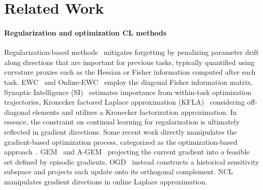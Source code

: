 \documentclass{article}
\begin{document}
\section{Related Work}

\paragraph{Regularization and optimization CL methods }

Regularization-based methods~\cite{EWC2017,onlineEWC,SI2017,KFLANEURIPS2018_Ritter} mitigates forgetting by penalizing parameter drift along directions that are important for previous tasks,
typically quantified using curvature proxies such as the Hessian or Fisher information computed after each task.
EWC~\cite{EWC2017} and Online-EWC~\cite{onlineEWC} employ the diagonal Fisher information matrix, 
Synaptic Intelligence (SI)~\cite{SI2017} estimates importance from within-task optimization trajectories,  Kronecker factored Laplace approximation
(KFLA)~\cite{KFLANEURIPS2018_Ritter} considering off-diagonal elements and utilizes a  Kronecker factorization approximation.
In essence, the constraint on continual learning for  regularization is ultimately reflected in gradient directions. 
Some recent work directly manipulates the gradient-based optimization process, categorized as the optimization-based approach~\cite{lopez-pazGradientEpisodicMemory2017,farajtabarOrthogonalGradientDescent2020,NEURIPS2021_ec5aa0b7,NEURIPS2020_70d85f35,wang2023orthogonal}. GEM~\cite{lopez-pazGradientEpisodicMemory2017} and A-GEM~\cite{chaudhry2019efficientlifelonglearningagem} projecting the current gradient into a feasible set defined by episodic gradients. OGD~\cite{farajtabarOrthogonalGradientDescent2020} instead constructs a historical sensitivity subspace and projects each update onto its orthogonal complement. NCL~\cite{NEURIPS2021_ec5aa0b7} manipulates gradient directions in online Laplace approximation.

\end{document}
